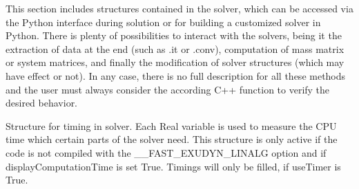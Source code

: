 This section includes structures contained in the solver, which can be accessed via the Python interface during solution or for building a customized solver in Python.
There is plenty of possibilities to interact with the solvers, being it the extraction of data at the end (such as .it or .conv), computation of mass matrix or system matrices, and finally the modification of solver structures (which may have effect or not). In any case, there is no full description for all these methods and the user must always consider the according C++ function to verify the desired behavior.


\label{sec:CSolverTimer}
Structure for timing in solver. Each Real variable is used to measure the CPU time which certain parts of the solver need. This structure is only active if the code is not compiled with the \_\_FAST\_EXUDYN\_LINALG option and if displayComputationTime is set True. Timings will only be filled, if useTimer is True.

